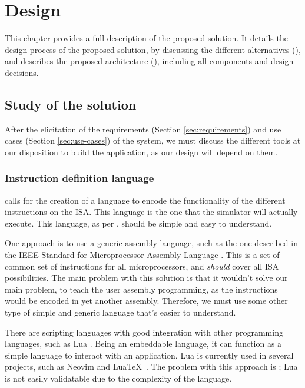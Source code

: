 \chapter{Design}\label{chap:design}
This chapter provides a full description of the proposed solution. It details the design process of the proposed solution, by discussing the different alternatives (), and describes the proposed architecture (), including all components and design decisions.


\section{Study of the solution}\label{sec:study}  %
After the elicitation of the requirements (Section \ref{sec:requirements}) and use cases (Section \ref{sec:use-cases}) of the system, we must discuss the different tools at our disposition to build the application, as our design will depend on them.


\subsection{Instruction definition language}\label{subsec:inst-lang-study}
 calls for the creation of a language to encode the functionality of the different \glspl{instruction} on the \gls{ISA}. This language is the one that the simulator will actually execute. This language, as per , should be simple and easy to understand.

One approach is to use a generic assembly language, such as the one described in the IEEE Standard for Microprocessor Assembly Language \parencite{IEEE-694-1985}. This is a set of common set of \glspl{instruction} for all microprocessors, and \textit{should} cover all \gls{ISA} possibilities. The main problem with this solution is that it wouldn't solve our main problem, to teach the user \gls{assembly} programming, as the \glspl{instruction} would be encoded in yet another \gls{assembly}. Therefore, we must use some other type of simple and generic language that's easier to understand.

There are scripting languages with good integration with other programming languages, such as Lua \parencite{lua}. Being an embeddable language, it can function as a simple language to interact with an application. Lua is currently used in several projects, such as Neovim \parencite{nvim-lua} and Lua\TeX~\parencite{luatex}. The problem with this approach is ; Lua is not easily validatable due to the complexity of the language. 

